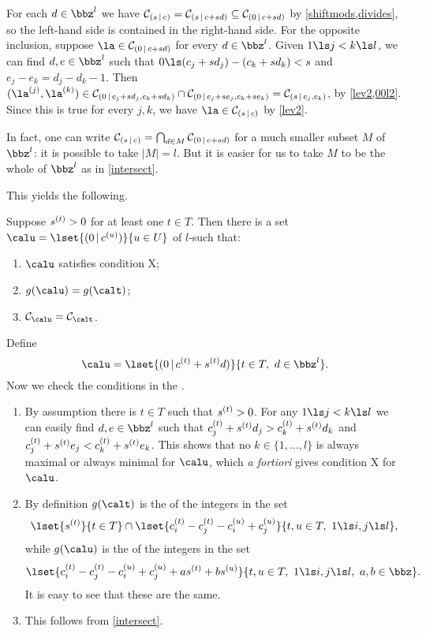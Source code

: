 \documentclass[a4paper, 11pt, twoside]{article}
\begin{document}
\begin{pf}
For each $d\in\bbz^l$ we have $\mathcal{C}_{(s\,|\,c)}=\mathcal{C}_{(s\,|\,c+sd)}\subseteq\mathcal{C}_{(0\,|\,c+sd)}$ by \cref{shiftmods,divides}, so the left-hand side is contained in the right-hand side. For the opposite inclusion, suppose $\la\in\mc0{c+sd}$ for every $d\in\bbz^l$. Given $1\ls j<k\ls l$, we can find $d,e\in\bbz^l$ such that $0\ls (c_j+sd_j)-(c_k+sd_k)<s$ and $e_j-e_k=d_j-d_k-1$. Then $(\cpt\la j,\cpt\la k)\in\mc0{c_j+sd_j,c_k+sd_k}\cap\mc0{c_j+se_j,c_k+se_k}=\mc s{c_j,c_k}$, by \cref{lev2,00l2}. Since this is true for every $j,k$, we have $\la\in\mc sc$ by \cref{lev2}.
\end{pf}

\begin{rmk}
In fact, one can write $\mathcal{C}_{(s\,|\,c)}=\bigcap_{d\in M}\mathcal{C}_{(0\,|\,c+sd)}$ for a much smaller subset $M$ of $\bbz^l$: it is possible to take $|M|=l$. But it is easier for us to take $M$ to be the whole of $\bbz^l$ as in \cref{intersect}.
\end{rmk}

This yields the following.%

\begin{propn}\label{change0}
Suppose $s^{(t)}>0$ for at least one $t\in T$. Then there is a set $\calu=\lset{(0\,|\,\sof cu)}{u\in U}$ of $l$-\mcds such that:
\begin{enumerate}
\item\label{hatx}
$\calu$ satisfies condition X;
\item\label{ghatg}
$g(\calu)=g(\calt)$;
\item\label{smchatsmc}
$\smc\calu=\smc\calt$.
\end{enumerate}
\end{propn}

\begin{pf}
Define
\[
\calu=\lset{(0\,|\,\sof ct+\sof std)}{t\in T,\ d\in\bbz^l}.
\]
Now we check the conditions in the .
\begin{enumerate}
\item
By assumption there is $t\in T$ such that $s^{(t)}>0$. For any $1\ls j<k\ls l$ we can easily find $d,e\in\bbz^l$ such that $c^{(t)}_j+s^{(t)}d_j>c^{(t)}_k+s^{(t)}d_k$ and $c^{(t)}_j+s^{(t)}e_j<c^{(t)}_k+s^{(t)}e_k$. This shows that no $k\in\{1,\dots,l\}$ is always maximal or always minimal for $\calu$, which \textit{a fortiori} gives condition X for $\calu$.
\item
By definition $g(\calt)$ is the \gcd of the integers in the set
\[
\lset{\sof st}{t\in T}\cap\lset{\sof ct_i-\sof ct_j-\sof cu_i+\sof cu_j}{t,u\in T,\ 1\ls i,j\ls l},
\]
while $g(\calu)$ is the \gcd of the integers in the set
\[
\lset{\sof ct_i-\sof ct_j-\sof cu_i+\sof cu_j+a\sof st+b\sof su}{t,u\in T,\ 1\ls i,j\ls l,\ a,b\in\bbz}.
\]
It is easy to see that these \gcds are the same.
\item
This follows from \cref{intersect}.\qedhere
\end{enumerate}
\end{pf}
\end{document}
